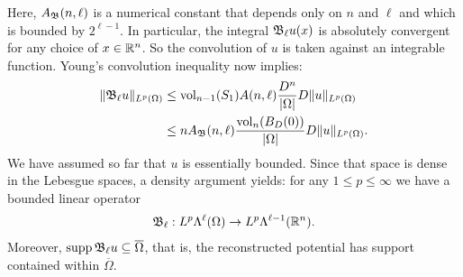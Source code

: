 \documentclass[10pt,letterpaper]{article}
\begin{document}
Here, $A_{{\mathfrak B}}(n,\ell)$ is a numerical constant that depends only on $n$ and $\ell$ 
and which is bounded by $2^{\ell-1}$. 
In particular, the integral ${\mathfrak B}_{\ell} u(x)$ is absolutely convergent for any choice of $x \in {\mathbb R}^{n}$. 
So the convolution of $u$ is taken against an integrable function. 
Young's convolution inequality now implies: 
\begin{align*}
    \| {\mathfrak B}_{\ell} u \|_{L^{p}(\Omega)}
    &
    \leq 
    \operatorname{vol}_{n-1}(S_1) A(n,\ell) \frac{ D^{n} }{|\Omega|} 
    D
    \| u \|_{L^{p}(\Omega)}
    \\&
    \leq 
    n A_{{\mathfrak B}}(n,\ell) \frac{ \operatorname{vol}_{n}(B_D(0)) }{|\Omega|} 
    D
    \| u \|_{L^{p}(\Omega)}
    .
\end{align*}
We have assumed so far that $u$ is essentially bounded.
Since that space is dense in the Lebesgue spaces, a density argument yields: 
for any $1 \leq p \leq \infty$ we have a bounded linear operator 
\begin{gather*}
    {\mathfrak B}_{\ell} : L^{p}\Lambda^{\ell}(\Omega) \rightarrow L^{p}\Lambda^{\ell-1}({\mathbb R}^n).
\end{gather*}
Moreover, $\operatorname{supp} {\mathfrak B}_{\ell} u \subseteq \overline\Omega$,
that is, the reconstructed potential has support contained within $\overline\Omega$. 
\\
\end{document}
